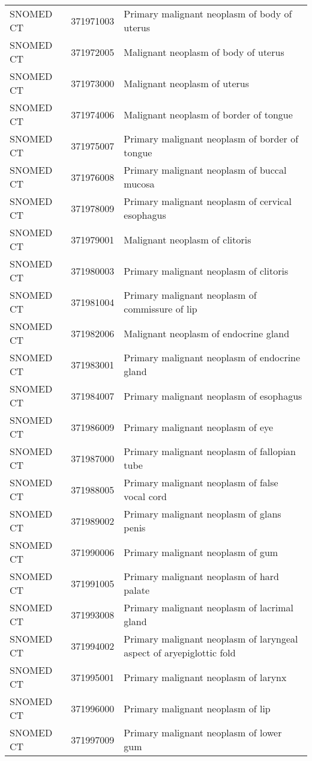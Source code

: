 \begin{longtable}{p{}p{}p{}}
  SNOMED CT & 371971003 & Primary malignant neoplasm of body of uterus \\ 
  SNOMED CT & 371972005 & Malignant neoplasm of body of uterus \\ 
  SNOMED CT & 371973000 & Malignant neoplasm of uterus \\ 
  SNOMED CT & 371974006 & Malignant neoplasm of border of tongue \\ 
  SNOMED CT & 371975007 & Primary malignant neoplasm of border of tongue \\ 
  SNOMED CT & 371976008 & Primary malignant neoplasm of buccal mucosa \\ 
  SNOMED CT & 371978009 & Primary malignant neoplasm of cervical esophagus \\ 
  SNOMED CT & 371979001 & Malignant neoplasm of clitoris \\ 
  SNOMED CT & 371980003 & Primary malignant neoplasm of clitoris \\ 
  SNOMED CT & 371981004 & Primary malignant neoplasm of commissure of lip \\ 
  SNOMED CT & 371982006 & Malignant neoplasm of endocrine gland \\ 
  SNOMED CT & 371983001 & Primary malignant neoplasm of endocrine gland \\ 
  SNOMED CT & 371984007 & Primary malignant neoplasm of esophagus \\ 
  SNOMED CT & 371986009 & Primary malignant neoplasm of eye \\ 
  SNOMED CT & 371987000 & Primary malignant neoplasm of fallopian tube \\ 
  SNOMED CT & 371988005 & Primary malignant neoplasm of false vocal cord \\ 
  SNOMED CT & 371989002 & Primary malignant neoplasm of glans penis \\ 
  SNOMED CT & 371990006 & Primary malignant neoplasm of gum \\ 
  SNOMED CT & 371991005 & Primary malignant neoplasm of hard palate \\ 
  SNOMED CT & 371993008 & Primary malignant neoplasm of lacrimal gland \\ 
  SNOMED CT & 371994002 & Primary malignant neoplasm of laryngeal aspect of aryepiglottic fold \\ 
  SNOMED CT & 371995001 & Primary malignant neoplasm of larynx \\ 
  SNOMED CT & 371996000 & Primary malignant neoplasm of lip \\ 
  SNOMED CT & 371997009 & Primary malignant neoplasm of lower gum \\ 

\end{longtable}
